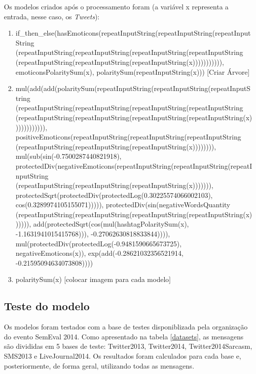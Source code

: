 \documentclass[12pt]{article}
\begin{document}
Os modelos criados após o processamento foram (a variável x representa a entrada, nesse caso, os \emph{Tweets}):
\begin{enumerate}[label=\Alph*]
	\item{if\_then\_else(hasEmoticons(repeatInputString(repeatInputString(repeatInputString\\(repeatInputString(repeatInputString(repeatInputString(repeatInputString\\(repeatInputString(repeatInputString(repeatInputString(x))))))))))), emoticonsPolaritySum(x), polaritySum(repeatInputString(x)))}  [Criar Árvore] 
	\item mul(add(add(polaritySum(repeatInputString(repeatInputString(repeatInputString\\(repeatInputString(repeatInputString(repeatInputString(repeatInputString\\(repeatInputString(repeatInputString(repeatInputString(repeatInputString(x)))))))))))), positiveEmoticons(repeatInputString(repeatInputString(repeatInputString\\(repeatInputString(repeatInputString(repeatInputString(x)))))))), mul(sub(sin(-0.7500287440821918), protectedDiv(negativeEmoticons(repeatInputString(repeatInputString(repeatInputString\\(repeatInputString(repeatInputString(repeatInputString(x))))))), \\protectedSqrt(protectedDiv(protectedLog(0.30225574066002103), cos(0.3289974105155071))))), protectedDiv(sin(negativeWordsQuantity\\(repeatInputString(repeatInputString(repeatInputString(repeatInputString(x)))))), add(protectedSqrt(cos(mul(hashtagPolaritySum(x), -1.1631941015415768))), -0.27062630818833844)))), mul(protectedDiv(protectedLog(-0.9481590665673725), negativeEmoticons(x)), exp(add(-0.28621032356521914, -0.21595094634073808))))
	\item{polaritySum(x)} [colocar imagem para cada modelo]
\end{enumerate}



\subsection{Teste do modelo}

Os modelos foram testados com a base de testes disponiblizada pela organização do evento SemEval 2014. Como apresentado na tabela \ref{datasets}, as mensagens são divididas em 5 bases de teste: Twitter2013, Twitter2014, Twitter2014Sarcasm, SMS2013 e LiveJournal2014. Os resultados foram calculados para cada base e, posteriormente, de forma geral, utilizando todas as mensagens.
\end{document}
